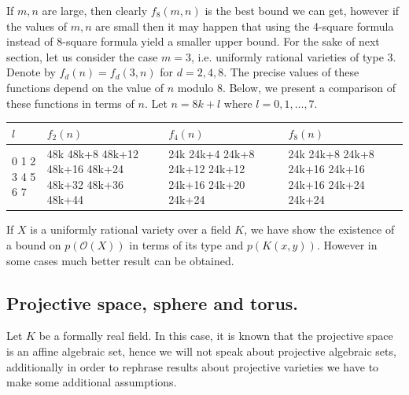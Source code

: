\documentclass[12pt,reqno]{amsart}   	%
\theoremstyle{obs}
\theoremstyle{prob}
\theoremstyle{conj}
\theoremstyle{remark}
\newcommand{\OO}{\mathcal{O}}
\begin{document}
 If $m,n$ are large, then clearly $f_8(m,n)$ is the best bound we can get, however if the values of $m,n$ are small then it may happen that using the 4-square formula instead of $8$-square formula yield a smaller upper bound. For the sake of next section, let us consider the case $m=3$, i.e. uniformly rational varieties of type $3.$ Denote by $f_d(n)=f_d(3,n)$ for $d=2,4,8$. The precise values of these functions depend on the value of $n$ modulo 8. Below, we present a comparison of these functions in terms of $n$. Let $n=8k+l$ where $l=0,1,\dots, 7$.


\begin{center}
\begin{tabular}{ | m{1em} | m{1.5cm}| m{} | m{} | } 
  \hline
  $l$ & $f_2(n)$ & $f_4(n)$ & $f_8(n)$ \\ 
  \hline
 0 1 2 3 4 5 6 7  & 48k 48k+8 48k+12 48k+16 48k+24 48k+32 48k+36 48k+44 & 24k 24k+4 24k+8 24k+12 24k+12 24k+16 24k+20 24k+24 & 24k 24k+8 24k+8 24k+16 24k+16 24k+16 24k+24 24k+24 \\ 
 \hline
\end{tabular}
\end{center}







If $X$ is a uniformly rational variety over a field $K$, we have show the existence of a bound on $p(\OO(X))$ in terms of its type and $p(K(x,y))$. However in some cases much better result can be obtained.





\subsection{Projective space, sphere and torus.}
Let $K$ be a formally real field. In this case, it is known \cite[Theorem 3.4.4]{bcr1998} that the projective space is an affine algebraic set, hence we will not speak about projective algebraic sets, additionally in order to rephrase results about projective varieties we have to make some additional assumptions.
\end{document}
